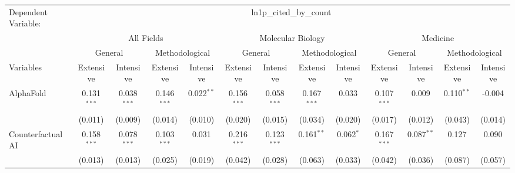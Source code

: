 \begingroup
\centering
\begin{tabular}{lcccccccccccc}
   \tabularnewline \midrule \midrule
   Dependent Variable: & \multicolumn{12}{c}{ln1p\_cited\_by\_count}\\
 & \multicolumn{4}{c}{All Fields} & \multicolumn{4}{c}{Molecular Biology} & \multicolumn{4}{c}{Medicine} \\
\cmidrule(lr){2-5} \cmidrule(lr){6-9} \cmidrule(lr){10-13}
 & \multicolumn{2}{c}{General} & \multicolumn{2}{c}{Methodological} & \multicolumn{2}{c}{General} & \multicolumn{2}{c}{Methodological} & \multicolumn{2}{c}{General} & \multicolumn{2}{c}{Methodological} \\
\cmidrule(lr){2-3} \cmidrule(lr){4-5} \cmidrule(lr){6-7} \cmidrule(lr){8-9} \cmidrule(lr){10-11} \cmidrule(lr){12-13}
Variables & \multicolumn{1}{c}{Extensive} & \multicolumn{1}{c}{Intensive} & \multicolumn{1}{c}{Extensive} & \multicolumn{1}{c}{Intensive} & \multicolumn{1}{c}{Extensive} & \multicolumn{1}{c}{Intensive} & \multicolumn{1}{c}{Extensive} & \multicolumn{1}{c}{Intensive} & \multicolumn{1}{c}{Extensive} & \multicolumn{1}{c}{Intensive} & \multicolumn{1}{c}{Extensive} & \multicolumn{1}{c}{Intensive} \\
\cmidrule(lr){1-1}\cmidrule(lr){2-2} \cmidrule(lr){3-3} \cmidrule(lr){4-4} \cmidrule(lr){5-5} \cmidrule(lr){6-6} \cmidrule(lr){7-7} \cmidrule(lr){8-8} \cmidrule(lr){9-9} \cmidrule(lr){10-10} \cmidrule(lr){11-11} \cmidrule(lr){12-12} \cmidrule(lr){13-13}
   AlphaFold                                & 0.131$^{***}$  & 0.038$^{***}$  & 0.146$^{***}$ & 0.022$^{**}$ & 0.156$^{***}$  & 0.058$^{***}$  & 0.167$^{***}$ & 0.033         & 0.107$^{***}$  & 0.009          & 0.110$^{**}$ & -0.004\\   
                                            & (0.011)        & (0.009)        & (0.014)       & (0.010)      & (0.020)        & (0.015)        & (0.034)       & (0.020)       & (0.017)        & (0.012)        & (0.043)      & (0.014)\\   
   Counterfactual AI                        & 0.158$^{***}$  & 0.078$^{***}$  & 0.103$^{***}$ & 0.031        & 0.216$^{***}$  & 0.123$^{***}$  & 0.161$^{**}$  & 0.062$^{*}$   & 0.167$^{***}$  & 0.087$^{**}$   & 0.127        & 0.090\\   
                                            & (0.013)        & (0.013)        & (0.025)       & (0.019)      & (0.042)        & (0.028)        & (0.063)       & (0.033)       & (0.042)        & (0.036)        & (0.087)      & (0.057)\\   

\end{tabular}
